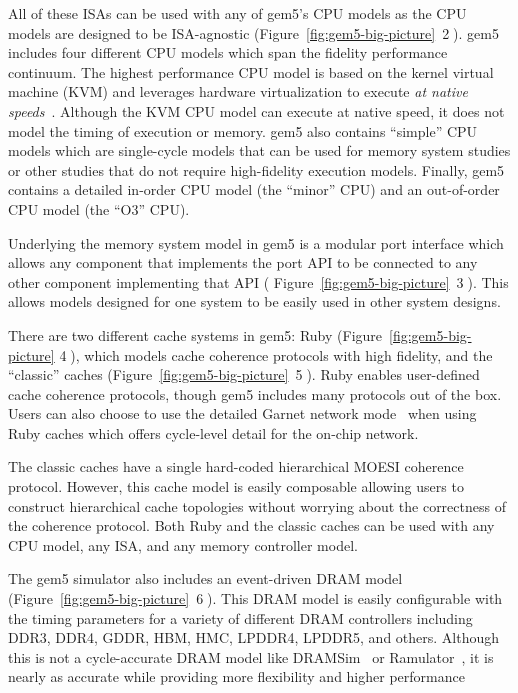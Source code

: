 All of these ISAs can be used with any of gem5's CPU models as the CPU models are designed to be ISA-agnostic (Figure~\ref{fig:gem5-big-picture}~\textcircled{2}).
gem5 includes four different CPU models which span the fidelity performance continuum.
The highest performance CPU model is based on the kernel virtual machine (KVM) and leverages hardware virtualization to execute \emph{at native speeds}~\cite{full-speed-ahead}.
Although the KVM CPU model can execute at native speed, it does not model the timing of execution or memory.
gem5 also contains ``simple'' CPU models which are single-cycle models that can be used for memory system studies or other studies that do not require high-fidelity execution models.
Finally, gem5 contains a detailed in-order CPU model (the ``minor'' CPU) and an out-of-order CPU model (the ``O3'' CPU).

Underlying the memory system model in gem5 is a modular port interface which allows any component that implements the port API to be connected to any other component implementing that API ( Figure~\ref{fig:gem5-big-picture}~\textcircled{3}).
This allows models designed for one system to be easily used in other system designs.

There are two different cache systems in gem5: Ruby (Figure~\ref{fig:gem5-big-picture} \textcircled{4}), which models cache coherence protocols with high fidelity, and the ``classic'' caches (Figure~\ref{fig:gem5-big-picture}~\textcircled{5}).
Ruby enables user-defined cache coherence protocols, though gem5 includes many protocols out of the box.
Users can also choose to use the detailed Garnet network mode~\cite{garnet-2} when using Ruby caches which offers cycle-level detail for the on-chip network.

The classic caches have a single hard-coded hierarchical MOESI coherence protocol.
However, this cache model is easily composable allowing users to construct hierarchical cache topologies without worrying about the correctness of the coherence protocol.
Both Ruby and the classic caches can be used with any CPU model, any ISA, and any memory controller model.

The gem5 simulator also includes an event-driven DRAM model (Figure~\ref{fig:gem5-big-picture}~\textcircled{6}).
This DRAM model is easily configurable with the timing parameters for a variety of different DRAM controllers including DDR3, DDR4, GDDR, HBM, HMC, LPDDR4, LPDDR5, and others.
Although this is not a cycle-accurate DRAM model like DRAMSim~\cite{} or Ramulator~\cite{}, it is nearly as accurate while providing more flexibility and higher performance~\cite{hansson-ispass-paper}

